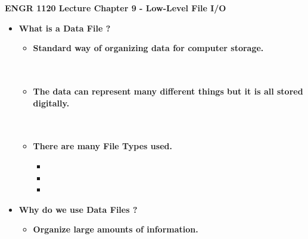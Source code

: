 \documentclass[11pt]{article}
\newcommand{\NUM}{9 }
\begin{document}
\textbf{ \LARGE ENGR 1120 Lecture Chapter \NUM - Low-Level File I/O } \\
	

\Large
\begin{itemize}


	
	\item \textbf{ \LARGE What is a \color{mypurple}Data  File \color{black}? }\\
	
	\begin{itemize}
	\item \textbf{ \LARGE Standard way of organizing data for computer storage. }\\\\\\
	
	\item \textbf{ \LARGE The data can represent many different things but it is all stored \color{mypurple}digitally\color{black}. }\\\\\\
	
	\item \textbf{ \LARGE There are many \color{mypurple}File Types \color{black} used. }\\
	\begin{itemize}
	\item \vspace{10mm}
	\item \vspace{10mm}
	\item \vspace{10mm}
	\end{itemize}
	
	\vspace{10mm}

		\end{itemize}
		\item \textbf{ \LARGE Why do we use \color{mypurple}Data  Files \color{black}? }\\
			\begin{itemize}
	\item \textbf{ \LARGE Organize large amounts of information.}\\\\\\
	

\end{itemize}
\end{itemize}
\end{document}
